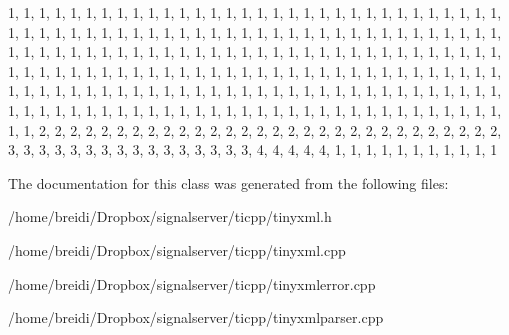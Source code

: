 \begin{DoxyCode}

{
  
    1,  1,  1,  1,  1,  1,  1,  1,  1,  1,  1,  1,  1,  1,  1,  1,  
    1,  1,  1,  1,  1,  1,  1,  1,  1,  1,  1,  1,  1,  1,  1,  1,  
    1,  1,  1,  1,  1,  1,  1,  1,  1,  1,  1,  1,  1,  1,  1,  1,  
    1,  1,  1,  1,  1,  1,  1,  1,  1,  1,  1,  1,  1,  1,  1,  1,  
    1,  1,  1,  1,  1,  1,  1,  1,  1,  1,  1,  1,  1,  1,  1,  1,  
    1,  1,  1,  1,  1,  1,  1,  1,  1,  1,  1,  1,  1,  1,  1,  1,  
    1,  1,  1,  1,  1,  1,  1,  1,  1,  1,  1,  1,  1,  1,  1,  1,  
    1,  1,  1,  1,  1,  1,  1,  1,  1,  1,  1,  1,  1,  1,  1,  1,  
    1,  1,  1,  1,  1,  1,  1,  1,  1,  1,  1,  1,  1,  1,  1,  1,  
    1,  1,  1,  1,  1,  1,  1,  1,  1,  1,  1,  1,  1,  1,  1,  1,  
    1,  1,  1,  1,  1,  1,  1,  1,  1,  1,  1,  1,  1,  1,  1,  1,  
    1,  1,  1,  1,  1,  1,  1,  1,  1,  1,  1,  1,  1,  1,  1,  1,  
    1,  1,  2,  2,  2,  2,  2,  2,  2,  2,  2,  2,  2,  2,  2,  2,  
    2,  2,  2,  2,  2,  2,  2,  2,  2,  2,  2,  2,  2,  2,  2,  2,  
    3,  3,  3,  3,  3,  3,  3,  3,  3,  3,  3,  3,  3,  3,  3,  3,  
    4,  4,  4,  4,  4,  1,  1,  1,  1,  1,  1,  1,  1,  1,  1,  1 
}
\end{DoxyCode}


The documentation for this class was generated from the following files:\begin{DoxyCompactItemize}
\item 
/home/breidi/Dropbox/signalserver/ticpp/tinyxml.h\item 
/home/breidi/Dropbox/signalserver/ticpp/tinyxml.cpp\item 
/home/breidi/Dropbox/signalserver/ticpp/tinyxmlerror.cpp\item 
/home/breidi/Dropbox/signalserver/ticpp/tinyxmlparser.cpp\end{DoxyCompactItemize}
